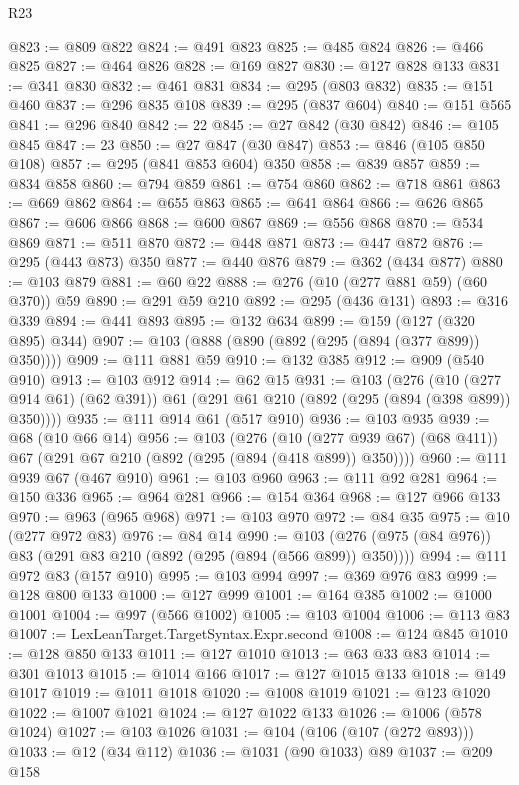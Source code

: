 \begin{lexlean}{R23}
\begin{coremodule}
@823 := @809 @822
@824 := @491 @823
@825 := @485 @824
@826 := @466 @825
@827 := @464 @826
@828 := @169 @827
@830 := @127 @828 @133
@831 := @341 @830
@832 := @461 @831
@834 := @295 (@803 @832)
@835 := @151 @460
@837 := @296 @835 @108
@839 := @295 (@837 @604)
@840 := @151 @565
@841 := @296 @840
@842 := 22
@845 := @27 @842 (@30 @842)
@846 := @105 @845
@847 := 23
@850 := @27 @847 (@30 @847)
@853 := @846 (@105 @850 @108)
@857 := @295 (@841 @853 @604) @350
@858 := @839 @857
@859 := @834 @858
@860 := @794 @859
@861 := @754 @860
@862 := @718 @861
@863 := @669 @862
@864 := @655 @863
@865 := @641 @864
@866 := @626 @865
@867 := @606 @866
@868 := @600 @867
@869 := @556 @868
@870 := @534 @869
@871 := @511 @870
@872 := @448 @871
@873 := @447 @872
@876 := @295 (@443 @873) @350
@877 := @440 @876
@879 := @362 (@434 @877)
@880 := @103 @879
@881 := @60 @22
@888 := @276 (@10 (@277 @881 @59) (@60 @370)) @59
@890 := @291 @59 @210
@892 := @295 (@436 @131)
@893 := @316 @339
@894 := @441 @893
@895 := @132 @634
@899 := @159 (@127 (@320 @895) @344)
@907 := @103 (@888 (@890 (@892 (@295 (@894 (@377 @899)) @350))))
@909 := @111 @881 @59
@910 := @132 @385
@912 := @909 (@540 @910)
@913 := @103 @912
@914 := @62 @15
@931 := @103
    (@276
      (@10 (@277 @914 @61) (@62 @391))
      @61
      (@291 @61 @210 (@892 (@295 (@894 (@398 @899)) @350))))
@935 := @111 @914 @61 (@517 @910)
@936 := @103 @935
@939 := @68 (@10 @66 @14)
@956 := @103
    (@276
      (@10 (@277 @939 @67) (@68 @411))
      @67
      (@291 @67 @210 (@892 (@295 (@894 (@418 @899)) @350))))
@960 := @111 @939 @67 (@467 @910)
@961 := @103 @960
@963 := @111 @92 @281
@964 := @150 @336
@965 := @964 @281
@966 := @154 @364
@968 := @127 @966 @133
@970 := @963 (@965 @968)
@971 := @103 @970
@972 := @84 @35
@975 := @10 (@277 @972 @83)
@976 := @84 @14
@990 := @103 (@276 (@975 (@84 @976)) @83 (@291 @83 @210 (@892 (@295 (@894 (@566 @899)) @350))))
@994 := @111 @972 @83 (@157 @910)
@995 := @103 @994
@997 := @369 @976 @83
@999 := @128 @800 @133
@1000 := @127 @999
@1001 := @164 @385
@1002 := @1000 @1001
@1004 := @997 (@566 @1002)
@1005 := @103 @1004
@1006 := @113 @83
@1007 := LexLeanTarget.TargetSyntax.Expr.second
@1008 := @124 @845
@1010 := @128 @850 @133
@1011 := @127 @1010
@1013 := @63 @33 @83
@1014 := @301 @1013
@1015 := @1014 @166
@1017 := @127 @1015 @133
@1018 := @149 @1017
@1019 := @1011 @1018
@1020 := @1008 @1019
@1021 := @123 @1020
@1022 := @1007 @1021
@1024 := @127 @1022 @133
@1026 := @1006 (@578 @1024)
@1027 := @103 @1026
@1031 := @104 (@106 (@107 (@272 @893)))
@1033 := @12 (@34 @112)
@1036 := @1031 (@90 @1033) @89
@1037 := @209 @158

\end{coremodule}
\end{lexlean}
